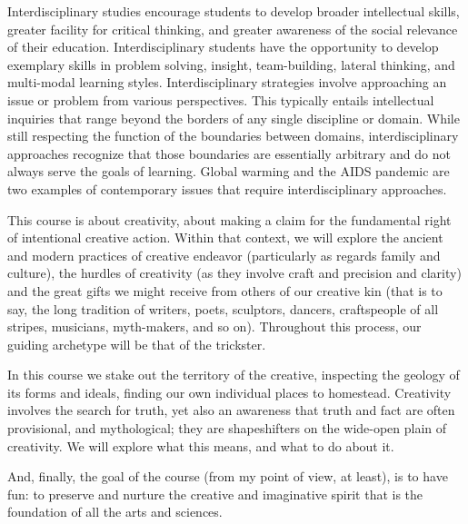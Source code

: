 \documentclass[letterpaper,10pt,headsepline]{scrreprt}
\begin{document}
Interdisciplinary studies encourage students to develop broader
intellectual skills, greater facility for critical thinking, and
greater awareness of the social relevance of their education.
Interdisciplinary students have the opportunity to develop exemplary
skills in problem solving, insight, team-building, lateral thinking,
and multi-modal learning styles. Interdisciplinary strategies involve
approaching an issue or problem from various perspectives. This
typically entails intellectual inquiries that range beyond the borders
of any single discipline or domain. While still respecting the
function of the boundaries between domains, interdisciplinary
approaches recognize that those boundaries are essentially arbitrary
and do not always serve the goals of learning. Global warming and the
AIDS pandemic are two examples of contemporary issues that require
interdisciplinary approaches.

This course is about creativity, about making a claim for the
fundamental right of intentional creative action. Within that context,
we will explore the ancient and modern practices of creative endeavor
(particularly as regards family and culture), the hurdles of
creativity (as they involve craft and precision and clarity) and the
great gifts we might receive from others of our creative kin (that is
to say, the long tradition of writers, poets, sculptors, dancers,
craftspeople of all stripes, musicians, myth-makers, and so on).
Throughout this process, our guiding archetype will be that of the
trickster.

In this course we stake out the territory of the creative, inspecting
the geology of its forms and ideals, finding our own individual places
to homestead. Creativity involves the search for truth, yet also an
awareness that truth and fact are often provisional, and mythological;
they are shapeshifters on the wide-open plain of creativity. We will
explore what this means, and what to do about it.

And, finally, the goal of the course (from my point of view, at
least), is to have fun: to preserve and nurture the creative and
imaginative spirit that is the foundation of all the arts and
sciences.
\end{document}
